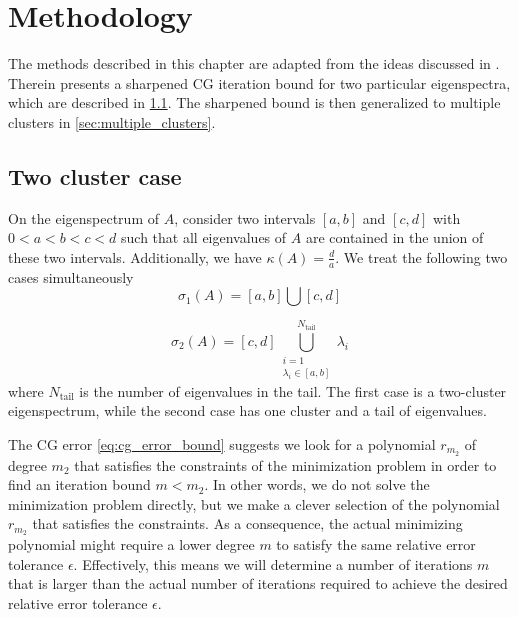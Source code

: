 \chapter{Methodology}\label{ch:methods}
The methods described in this chapter are adapted from the ideas discussed in \cite[Section 4]{cg_sharpened_convrate_Axelsson1976}. Therein \citeauthor{cg_sharpened_convrate_Axelsson1976} presents a sharpened CG iteration bound for two particular eigenspectra, which are described in \cref{sec:cg_sharpened_convrate}. The sharpened bound is then generalized to multiple clusters in \cref{sec:multiple_clusters}. 

\section{Two cluster case}\label{sec:cg_sharpened_convrate}
On the eigenspectrum of $A$, consider two intervals $[a, b]$ and $[c, d]$ with $0 < a < b < c < d$ such that all eigenvalues of $A$ are contained in the union of these two intervals. Additionally, we have $\kappa(A) = \frac{d}{a}$. We treat the following two cases simultaneously
\begin{equation}
    \sigma_1(A) = [a,b] \bigcup [c,d]
    \label{eq:two_clusters}
\end{equation}

\begin{equation}
    \sigma_2(A) = [c,d] \bigcup_{\substack{i=1 \\ \lambda_i \in [a,b]}}^{N_{\text{tail}}} \lambda_i
    \label{eq:one_cluster_with_tail}
\end{equation}
where $N_{\text{tail}}$ is the number of eigenvalues in the tail. The first case is a two-cluster eigenspectrum, while the second case has one cluster and a tail of eigenvalues.

The CG error \cref{eq:cg_error_bound} suggests we look for a polynomial $r_{m_2}$ of degree $m_2$ that satisfies the constraints of the minimization problem in order to find an iteration bound $m < m_2$. In other words, we do not solve the minimization problem directly, but we make a clever selection of the polynomial $r_{m_2}$ that satisfies the constraints. As a consequence, the actual minimizing polynomial might require a lower degree $m$ to satisfy the same relative error tolerance $\epsilon$. Effectively, this means we will determine a number of iterations $m$ that is larger than the actual number of iterations required to achieve the desired relative error tolerance $\epsilon$.

